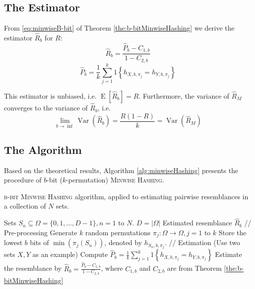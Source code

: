 \documentclass[a4paper]{article}
\DeclareMathOperator{\Var}{Var}
\DeclareMathOperator{\E}{E}
\begin{document}
\subsection{The Estimator}

From \vref{eq:minwiseB-bit} of Theorem \vref{the:b-bitMinwiseHashing} we derive the estimator $\hat{R}_b$ for $R$:
\begin{equation}
\hat{R}_b=\frac{\hat{P}_b-C_{1,b}}{1-C_{2,b}}
\end{equation}
\begin{equation}
\hat{P}_b = \frac{1}{k}\sum_{j=1}^k 1 \left\lbrace  h_{X,b,\pi_j } = h_{Y,b,\pi_j } \right\rbrace
\end{equation}

This estimator is unbiased, i.e. $\E[\hat{R}_b]=R$. Furthermore, the variance of $\hat{R}_M$ converges to the variance of $\hat{R}_b$, i.e.
\begin{equation}
\lim_{b\rightarrow\inf}\Var\left(\hat{R}_b\right)=\frac{R(1-R)}{k}=\Var\left(\hat{R}_M\right)
\end{equation}

\subsection{The Algorithm}

Based on the theoretical results, Algorithm \vref{alg:minwiseHashing} presents the procedure of $b$-bit ($k$-permutation) \textsc{Minwise Hashing}.

\begin{algorithm}[H]
\caption{\textsc{b-bit Minwise Hashing} algorithm, applied to estimating pairwise resemblances in a collection of $N$ sets.}
\label{alg:minwiseHashing}
\begin{algorithmic}
\Require Sets $S_n \subseteq \Omega = \{0,1,\ldots,D-1\}, n = 1 \text{ to } N$. \Comment $D = \left| \Omega \right|$
\Ensure Estimated resemblance $\hat{R}_b$
\State // Pre-processing
\State Generate $k$ random permutations $\pi_j: \Omega\longrightarrow\Omega, j=1\text{ to }k$
	\State Store the lowest $b$ bits of $\min(\pi_j(S_n))$, denoted by $h_{S_n,b,\pi_j}$.
\EndFor
\State
\State // Estimation (Use two sets $X,Y$ as an example)
\State Compute $\hat{P}_b = \frac{1}{k}\sum_{j=1}^k 1 \left\lbrace  h_{X,b,\pi_j } = h_{Y,b,\pi_j } \right\rbrace$
\State Estimate the resemblance by $\hat{R}_b = \frac{\hat{P}_b-C_{1,b}}{1-C_{2,b}}$, where $C_{1,b}$ and $C_{2,b}$ are from Theorem \vref{the:b-bitMinwiseHashing}
\end{algorithmic}
\end{algorithm}
\end{document}
